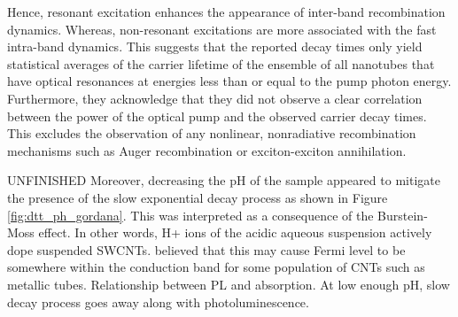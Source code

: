 Hence, resonant excitation enhances the appearance of inter-band recombination dynamics. Whereas, non-resonant excitations are more associated with the fast intra-band dynamics. This suggests that the reported decay times only yield statistical averages of the carrier lifetime of the ensemble of all nanotubes that have optical resonances at energies less than or equal to the pump photon energy. Furthermore, they acknowledge that they did not observe a clear correlation between the power of the optical pump and the observed carrier decay times. This excludes the observation of any nonlinear, nonradiative recombination mechanisms such as Auger recombination or exciton-exciton annihilation.


{\color{red} UNFINISHED }Moreover, decreasing the pH of the sample appeared to mitigate the presence of the slow exponential decay process as shown in Figure \ref{fig:dtt_ph_gordana}. This was interpreted as a consequence of the Burstein-Moss effect. In other words, H+ ions of the acidic aqueous suspension actively dope suspended SWCNTs. believed that this may cause Fermi level to be somewhere within the conduction band for some population of CNTs such as metallic tubes. Relationship between PL and absorption. At low enough pH, slow decay process goes away along with photoluminescence.

